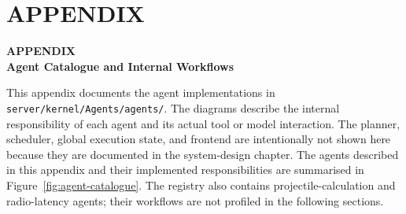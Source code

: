 \chapter*{\uppercase{APPENDIX}}
\hypertarget{appendix-heading}{}
\makeatletter
\def\@currentHref{appendix-heading}
\makeatother
\vspace{-0.4cm}
\hypertarget{appendix-a-heading}{}
\begin{center}
{\Large\bfseries APPENDIX \thechapter\\[0.25em]
Agent Catalogue and Internal Workflows}
\end{center}
\makeatletter
\def\@currentHref{appendix-a-heading}
\makeatother
\label{app:agents}
\setlength{\intextsep}{\baselineskip}

This appendix documents the agent implementations in
\texttt{server/kernel/Agents/agents/}. The diagrams describe the internal
responsibility of each agent and its actual tool or model interaction. The
planner, scheduler, global execution state, and frontend are intentionally not
shown here because they are documented in the system-design chapter.
The agents described in this appendix and their implemented responsibilities
are summarised in Figure~\ref{fig:agent-catalogue}. The registry also contains
projectile-calculation and radio-latency agents; their workflows are not
profiled in the following sections.

